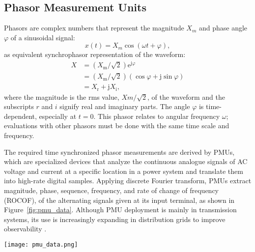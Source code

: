 \subsection{Phasor Measurement Units}\label{subsec:ch1/sec2/sub2}

Phasors are complex numbers that represent the magnitude $X_m$  and phase angle $\varphi$ of a sinusoidal signal:
\begin{equation}
    x(t)=X_m \cos (\omega t+\varphi),
    \label{eq:phasor}
\end{equation}
as equivalent synchrophasor representation of the waveform:
\begin{equation}
    \begin{aligned}
X & =\left(X_{\mathrm{m}} / \sqrt{2}\right) \mathrm{e}^{\mathrm{j} \varphi} \\
& =\left(X_{\mathrm{m}} / \sqrt{2}\right)(\cos \varphi+\mathrm{j} \sin \varphi) \\
& =X_{\mathrm{r}}+\mathrm{j} X_{\mathrm{i}},
\end{aligned}
\end{equation}
where the magnitude is the rms value, $Xm /\sqrt{2}$, of the waveform and the subscripts $r$ and $i$ signify real and imaginary parts. The angle $\varphi$ is time-dependent, especially at $t = 0$. This phasor relates to angular frequency $\omega$; evaluations with other phasors must be done with the same time scale and frequency.

The required time synchronized phasor measurements are derived by PMUs, which are specialized devices that analyze the continuous analogue signals of AC voltage and current at a specific location in a power system and translate them into high-rate digital samples. Applying discrete Fourier transform, PMUs extract magnitude, phase, sequence, frequency, and rate of change of frequency (ROCOF), of the alternating signals given at its input terminal, as shown in Figure~\cref{fig:pmu_data}. Although PMU deployment is mainly in transmission systems, its use is increasingly expanding in distribution grids to improve observability \autocite{7779155}.


\begin{figure*}[htbp]
    \centering
    \texttt{[image: pmu\_data.png]}
    \caption{The extraction of synchrophasor data packets in power systems.}
    \label{fig:pmu_data}
\end{figure*}

